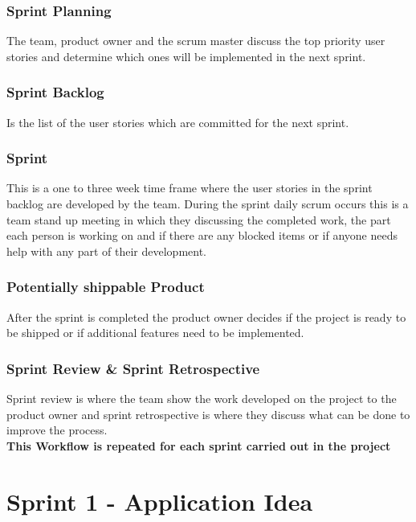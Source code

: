 \documentclass[a4paper,12pt]{report}
\begin{document}
\subsubsection{Sprint Planning}
The team, product owner and the scrum master discuss the top priority user stories and determine which ones will be implemented in the next sprint.
\subsubsection{Sprint Backlog}
Is the list of the user stories which are committed for the next sprint.
\subsubsection{Sprint}
This is a one to three week time frame where the user stories in the sprint backlog are developed by the team. During the sprint daily scrum occurs this is a team stand up meeting in which they discussing the completed work, the part each person is working on and if there are any blocked items or if anyone needs help with any part of their development.
\subsubsection{Potentially shippable Product}
After the sprint is completed the product owner decides if the project is ready to be shipped or if additional features need to be implemented.
\subsubsection{Sprint Review \& Sprint Retrospective}
Sprint review is where the team show the work developed on the project to the product owner and sprint retrospective is where they discuss what can be done to improve the process.\\
\textbf{This Workflow is repeated for each sprint carried out in the project}
\section{Sprint 1 - Application Idea}
\end{document}
